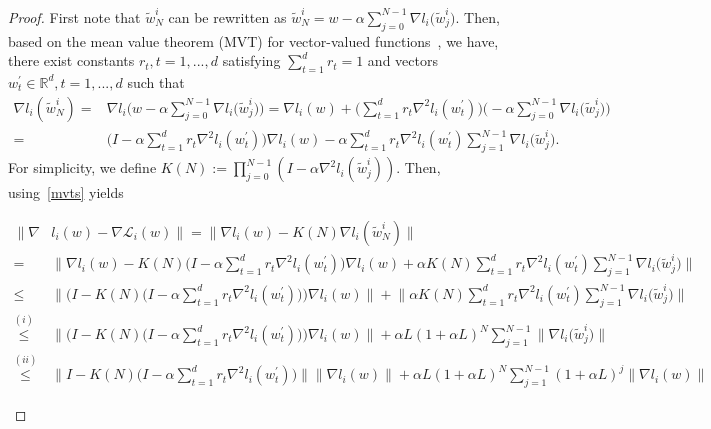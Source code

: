 \documentclass{osudissert96}
\begin{document}
\begin{proof}
	First note that $\widetilde w_N^i$ can be rewritten as $\widetilde w_N^i = w - \alpha \sum_{j=0}^{N-1} \nabla l_i\big(\widetilde w_j^i\big)$. Then, based on  the mean value theorem (MVT) for vector-valued functions~\cite{mcleod1965mean}, we have, there exist constants $r_t, t=1,...,d$ satisfying $\sum_{t=1}^d r_t =1$ and vectors $w_t^\prime\in\mathbb{R}^d, t=1,...,d$ such that     
	\begin{align}\label{mvts}
	\nabla l_i( \widetilde w^i _{N}) =& \nabla l_i\Big( w - \alpha \sum_{j=0}^{N-1} \nabla l_i\big(\widetilde w_j^i\big)\Big)= \nabla l_i(w) + \Big(\sum_{t=1}^dr_t\nabla^2 l_i (w_t^\prime)\Big) \Big(-\alpha \sum_{j=0}^{N-1} \nabla l_i\big(\widetilde w_j^i\big)\Big) \nonumber
	\\ = &  \Big(I- \alpha\sum_{t=1}^dr_t\nabla^2 l_i (w_t^\prime)\Big)\nabla l_i(w) - \alpha \sum_{t=1}^dr_t\nabla^2 l_i (w_t^\prime) \sum_{j=1}^{N-1} \nabla l_i\big(\widetilde w_j^i\big).
	\end{align}
	For simplicity, we define  $K(N):=  \prod_{j=0}^{N-1}(I-\alpha \nabla^2 l_i(\widetilde w^i_{j}))$. Then, using~\cref{mvts} yields 
	\begin{small}
	\begin{align}
	\|\nabla &l_i(w) - \nabla \mathcal{L}_i(w)\| = \|\nabla l_i(w) - K(N)\nabla l_i(\widetilde w_N^i)\| \nonumber
	\\ =& \Big\|\nabla l_i(w) - K(N)\Big(I- \alpha\sum_{t=1}^dr_t\nabla^2 l_i (w_t^\prime)\Big)\nabla l_i(w)  + \alpha K(N)\sum_{t=1}^dr_t\nabla^2 l_i (w_t^\prime)\sum_{j=1}^{N-1} \nabla l_i\big(\widetilde w_j^i\big)\Big\| \nonumber
	\\ \leq & \Big\|\Big(I - K(N)\Big(I- \alpha\sum_{t=1}^dr_t\nabla^2 l_i (w_t^\prime)\Big)\Big)\nabla l_i(w) \Big\| + \Big\| \alpha K(N)\sum_{t=1}^dr_t\nabla^2 l_i (w_t^\prime)\sum_{j=1}^{N-1} \nabla l_i\big(\widetilde w_j^i\big)\Big\| \nonumber
	\\ \overset{(i)}\leq & \Big\|\Big(I - K(N)\Big(I- \alpha\sum_{t=1}^dr_t\nabla^2 l_i (w_t^\prime)\Big)\Big)\nabla l_i(w) \Big\| + \alpha L (1+\alpha L)^N \sum_{j=1}^{N-1}  \Big\| \nabla l_i\big(\widetilde w_j^i\big)\Big\| \nonumber
	\\\overset{(ii)}\leq & \Big\|I - K(N)\Big(I- \alpha\sum_{t=1}^dr_t\nabla^2 l_i (w_t^\prime)\Big)\Big\|\|\nabla l_i(w)\| + \alpha L (1+\alpha L)^N \sum_{j=1}^{N-1}  (1+\alpha L)^j \|\nabla l_i(w)\| \nonumber

\end{align}
\end{small}
\end{proof}
\end{document}
